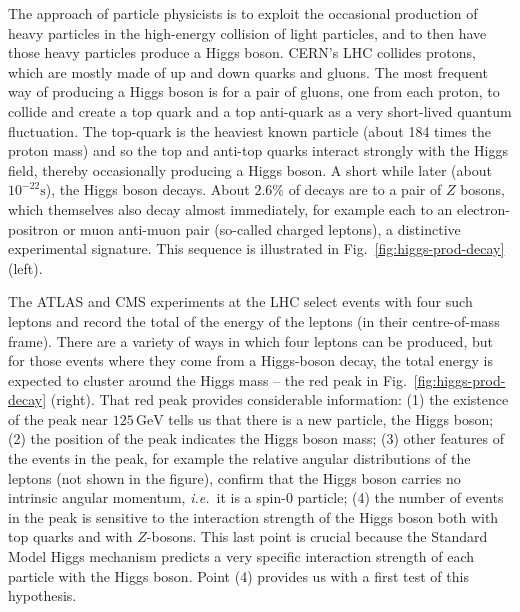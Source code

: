 \documentclass{article}
\newcommand{\GeV}{\,\text{GeV}}
\begin{document}
The approach of particle physicists is to exploit the occasional production of heavy particles in the high-energy collision of light particles, and to then have 
those heavy particles produce a Higgs boson.
%
CERN's LHC collides protons, which are mostly made of up and down
quarks and gluons.
%
The most frequent way of producing a Higgs boson
%
is for a pair of gluons, one from each proton, to collide and
create a top quark and a top anti-quark as a very short-lived quantum
fluctuation.
%
The top-quark is the heaviest known particle (about 184 times the
proton mass) and so the top and anti-top quarks interact
strongly with the Higgs field, thereby occasionally producing a Higgs
boson.
%
A short while later (about $10^{-22}\text{s}$), the Higgs boson decays.
%
About $2.6\%$ of decays are to a pair of $Z$ bosons, which themselves
also decay almost immediately, for example each to an
electron-positron or muon anti-muon pair (so-called charged leptons),
a distinctive experimental signature.
%
This sequence is illustrated in Fig.~\ref{fig:higgs-prod-decay} (left).

The ATLAS and CMS experiments at the LHC select events with four such
leptons and record the total of the energy of the leptons (in their
centre-of-mass frame).
%
There are a variety of ways in which four leptons can be produced, but
for those events where they come from a Higgs-boson decay, the total
energy is expected to cluster around the Higgs mass --  
the red peak in Fig.~\ref{fig:higgs-prod-decay} (right).
%
That red peak provides considerable information:
%
(1) the existence of the peak near $125\GeV$ tells us that there is a
new particle, the Higgs boson;
%
(2) the position of the peak indicates the Higgs boson mass;
%
%
(3) other features of the events in the peak, for example the relative
angular distributions of the leptons (not shown in the figure),
confirm that the Higgs boson carries no intrinsic angular momentum,
{\it i.e.}\ it is a spin-0 particle;
%
(4) the number of events in the peak is sensitive to the interaction
strength of the Higgs boson both with top quarks and with $Z$-bosons.
%
This last point is crucial
%
because the Standard Model Higgs mechanism
predicts a very specific
interaction strength of each particle with the Higgs boson.
Point (4) provides us with a first test of this hypothesis.
\end{document}
